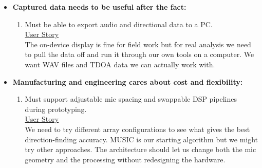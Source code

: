 \begin{itemize}
\begin{enumerate}
		\item Must still work in damp conditions.\\ [.5cm] \underline{User Story}\\
		I work in crawl spaces, mechanical rooms, and sometimes outside.  A little moisture or humidity shouldn't kill it.
		\bigskip
	\end{enumerate}

	\item \textbf{Captured data needs to be useful after the fact:}
	\begin{enumerate}
		\item Must be able to export audio and directional data to a PC.\\ [.5cm] \underline{User Story}\\
		The on-device display is fine for field work but for real analysis we need to pull the data off and run it through our own tools on a computer.  We want WAV files and TDOA data we can actually work with.
		\bigskip
	\end{enumerate}

	\item \textbf{Manufacturing and engineering cares about cost and flexibility:}
	\begin{enumerate}
		\item Must support adjustable mic spacing and swappable DSP pipelines during prototyping.\\ [.5cm] \underline{User Story}\\
		We need to try different array configurations to see what gives the best direction-finding accuracy.  MUSIC is our starting algorithm but we might try other approaches.  The architecture should let us change both the mic geometry and the processing without redesigning the hardware.
		\bigskip
	\end{enumerate}
\end{itemize}
